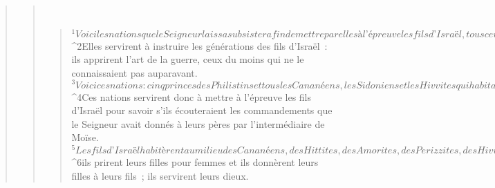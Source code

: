 \begin{verse}
\begin{verse}
         
      \bchapter{}
      \begin{verse}
${}^{1}Voici les nations que le Seigneur laissa subsister afin de mettre par elles à l’épreuve les fils d’Israël, tous ceux qui n’avaient connu aucune des guerres de Canaan. 
${}^{2}Elles servirent à instruire les générations des fils d’Israël : ils apprirent l’art de la guerre, ceux du moins qui ne le connaissaient pas auparavant. 
${}^{3}Voici ces nations : cinq princes des Philistins et tous les Cananéens, les Sidoniens et les Hivvites qui habitaient la montagne du Liban depuis la montagne de Baal-Hermon jusqu’à l’Entrée-de-Hamath. 
${}^{4}Ces nations servirent donc à mettre à l’épreuve les fils d’Israël pour savoir s’ils écouteraient les commandements que le Seigneur avait donnés à leurs pères par l’intermédiaire de Moïse. 
${}^{5}Les fils d’Israël habitèrent au milieu des Cananéens, des Hittites, des Amorites, des Perizzites, des Hivvites, des Jébuséens ; 
${}^{6}ils prirent leurs filles pour femmes et ils donnèrent leurs filles à leurs fils ; ils servirent leurs dieux.
      

\end{verse}
\end{verse}
\end{verse}
